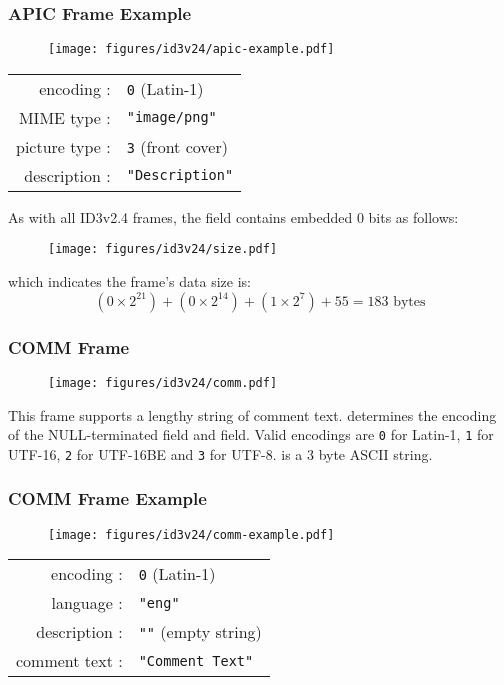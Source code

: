 \clearpage

\subsubsection{APIC Frame Example}
\begin{figure}[h]
\texttt{[image: figures/id3v24/apic-example.pdf]}
\end{figure}
\begin{table}[h]
\begin{tabular}{rl}
encoding : & \texttt{0} (Latin-1) \\
MIME type : & \texttt{"image/png"} \\
picture type : & \texttt{3} (front cover) \\
description : & \texttt{"Description"} \\
\end{tabular}
\end{table}
\par
\noindent
As with all ID3v2.4 frames, the  field contains
embedded 0 bits as follows:
\begin{figure}[h]
\texttt{[image: figures/id3v24/size.pdf]}
\end{figure}
\par
\noindent
which indicates the frame's data size is:
\begin{equation*}
(0 \times 2 ^ {21}) + (0 \times 2 ^ {14}) + (1 \times 2 ^ {7}) + 55 = 183 \text{ bytes}
\end{equation*}

\clearpage

\subsubsection{COMM Frame}
\begin{figure}[h]
\texttt{[image: figures/id3v24/comm.pdf]}
\end{figure}
\par
\noindent
This frame supports a lengthy string of comment text.
 determines the encoding of the NULL-terminated
 field and  field.
Valid encodings are \texttt{0} for Latin-1,
\texttt{1} for UTF-16,
\texttt{2} for UTF-16BE
and \texttt{3} for UTF-8.
 is a 3 byte ASCII string.

\subsubsection{COMM Frame Example}
\begin{figure}[h]
\texttt{[image: figures/id3v24/comm-example.pdf]}
\end{figure}
\begin{table}[h]
\begin{tabular}{rl}
encoding : & \texttt{0} (Latin-1) \\
language : & \texttt{"eng"} \\
description : & \texttt{""} (empty string) \\
comment text : & \texttt{"Comment Text"} \\
\end{tabular}
\end{table}

